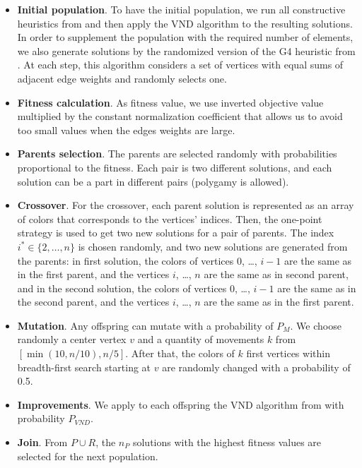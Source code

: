 \documentclass[runningheads]{llncs}
\begin{document}
\begin{itemize}
	\item \textbf{Initial population}. To have the initial population, we run all constructive heuristics from \cite{Erzin:24} and then apply the VND algorithm to the resulting solutions. In order to supplement the population with the required number of elements, we also generate solutions by the randomized version of the G4 heuristic from \cite{Erzin:24}. At each step, this algorithm considers a set of vertices with equal sums of adjacent edge weights and randomly selects one.
	\item \textbf{Fitness calculation}. As fitness value, we use inverted objective value multiplied by the constant normalization coefficient that allows us to avoid too small values when the edges weights are large.
	\item \textbf{Parents selection}. The parents are selected randomly with probabilities proportional to the fitness. Each pair is two different solutions, and each solution can be a part in different pairs (polygamy is allowed).
	\item \textbf{Crossover}. For the crossover, each parent solution is represented as an array of colors that corresponds to the vertices’ indices. Then, the one-point strategy is used to get two new solutions for a pair of parents. The index $i^* \in \{2, \dots, n\}$ is chosen randomly, and two new solutions are generated from the parents: in first solution, the colors of vertices 0, \dots, $i-1$ are the same as in the first parent, and the vertices $i$, \dots, $n$ are the same as in second parent, and in the second solution, the colors of vertices 0, \dots, $i-1$ are the same as in the second parent, and the vertices $i$, \dots, $n$ are the same as in the first parent.
	\item \textbf{Mutation}. Any offspring can mutate with a probability of $P_M$. We choose randomly a center vertex $v$ and a quantity of movements $k$ from $\left[\min(10, n/10), n/5 \right]$. After that, the colors of $k$ first vertices within breadth-first search starting at $v$ are randomly changed with a probability of 0.5.
	\item \textbf{Improvements}.  We apply to each offspring the VND algorithm from \cite{Erzin:24} with probability $P_{VND}$.
	\item \textbf{Join}. From $P \cup R$, the $n_P$ solutions with the highest fitness values are selected for the next population.
\end{itemize}
\end{document}
